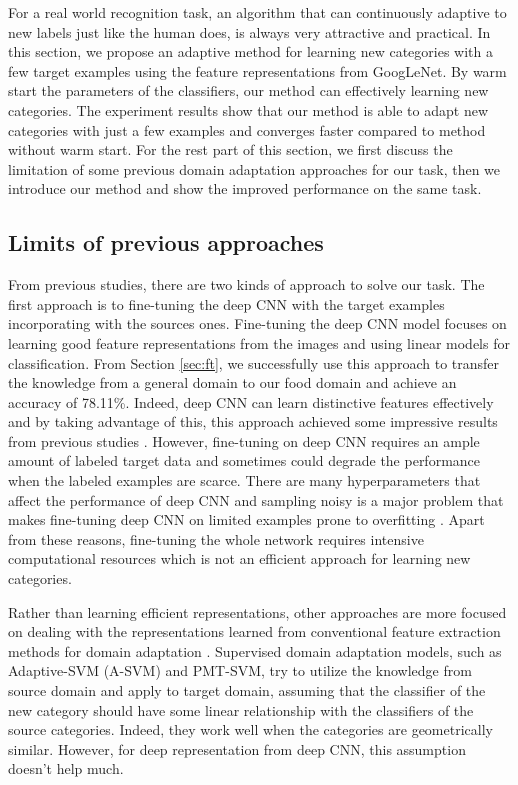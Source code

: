 ﻿For a real world recognition task, an algorithm that can continuously adaptive to new labels just like the human does, is always very attractive and practical.
In this section, we propose an adaptive method for learning new categories with a few target examples using the feature representations from GoogLeNet. By warm start the parameters of the classifiers, our method can effectively learning new categories. The experiment results show that our method is able to adapt new categories with just a few examples and converges faster compared to method without warm start.
For the rest part of this section, we first discuss the limitation of some previous domain adaptation approaches for our task, then we introduce our method and show the improved performance on the same task.

\subsection{Limits of previous approaches}
From previous studies, there are two kinds of approach to solve our task. The first approach is to fine-tuning the deep CNN with the target examples incorporating with the sources ones.
Fine-tuning the deep CNN model focuses on learning good feature representations from the images and using linear models for classification. From Section \ref{sec:ft}, we successfully use this approach to transfer the knowledge from a general domain to our food domain and achieve an accuracy of 78.11\%. Indeed, deep CNN can learn distinctive features effectively and by taking advantage of this, this approach achieved some impressive results from previous studies\cite{Chatfield14} \cite{zeiler2014visualizing}. However, fine-tuning on deep CNN requires an ample amount of labeled target data and sometimes could degrade the performance when the labeled examples are scarce\cite{hoffman2013one}. There are many hyperparameters that affect the performance of deep CNN and sampling noisy is a major problem that makes fine-tuning deep CNN on limited examples prone to overfitting \cite{srivastava2014dropout}. Apart from these reasons, fine-tuning the whole network requires intensive computational resources which is not an efficient approach for learning new categories.

Rather than learning efficient representations, other approaches are more focused on dealing with the representations learned from conventional feature extraction methods for domain adaptation \cite{yang2007adapting} \cite{aytar2011tabula}. Supervised domain adaptation models, such as Adaptive-SVM (A-SVM) and PMT-SVM, try to utilize the knowledge from source domain and apply to target domain, assuming that the classifier of the new category should have some linear relationship with the classifiers of the source categories. Indeed, they work well when the categories are geometrically similar. However, for deep representation from deep CNN, this assumption doesn't help much.

